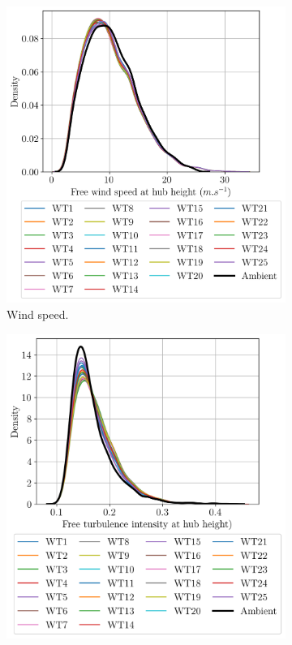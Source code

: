 \begin{figure}
    \centering
    \begin{subfigure}[b]{0.48\textwidth}
        \includegraphics[width=\textwidth]{part2/figures/WAKE/perturbed_wsp_distribution_SB.png}
        \caption{Wind speed.}
        \label{fig:FIGMarginalWSP}
    \end{subfigure}
    \begin{subfigure}[b]{0.48\textwidth}
        \includegraphics[width=\textwidth]{part2/figures/WAKE/perturbed_ti_distribution_SB.png}

\end{subfigure}
\end{figure}
